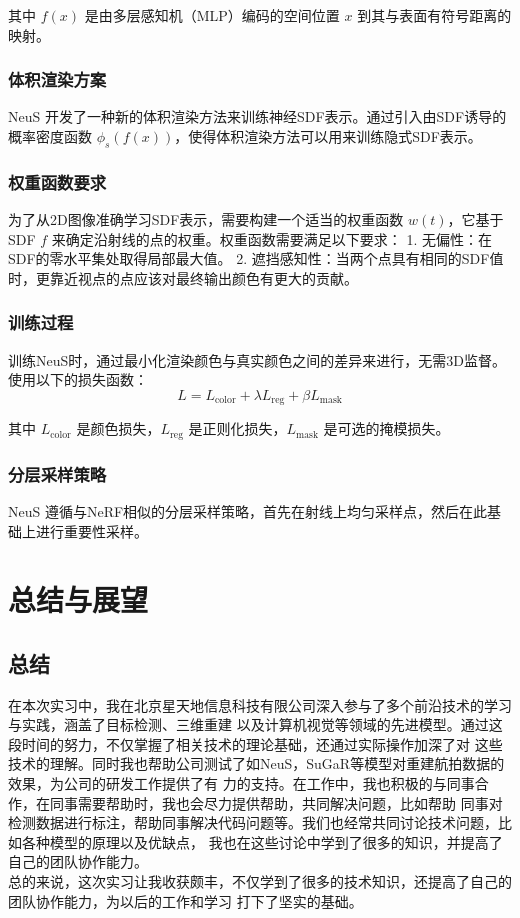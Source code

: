 \documentclass{nwputhesis}
\begin{document}
其中 \( f(x) \) 是由多层感知机（MLP）编码的空间位置 \( x \) 到其与表面有符号距离的映射。

\subsubsection{体积渲染方案}
NeuS 开发了一种新的体积渲染方法来训练神经SDF表示。通过引入由SDF诱导的概率密度函数 \( \phi_s(f(x)) \)，使得体积渲染方法可以用来训练隐式SDF表示。

\subsubsection{权重函数要求}
为了从2D图像准确学习SDF表示，需要构建一个适当的权重函数 \( w(t) \)，它基于SDF \( f \) 来确定沿射线的点的权重。权重函数需要满足以下要求：
1. 无偏性：在SDF的零水平集处取得局部最大值。
2. 遮挡感知性：当两个点具有相同的SDF值时，更靠近视点的点应该对最终输出颜色有更大的贡献。

\subsubsection{训练过程}
训练NeuS时，通过最小化渲染颜色与真实颜色之间的差异来进行，无需3D监督。使用以下的损失函数：
\[ L = L_{\text{color}} + \lambda L_{\text{reg}} + \beta L_{\text{mask}} \]


其中 \( L_{\text{color}} \) 是颜色损失，\( L_{\text{reg}} \) 是正则化损失，\( L_{\text{mask}} \) 是可选的掩模损失。

\subsubsection{分层采样策略}
NeuS 遵循与NeRF相似的分层采样策略，首先在射线上均匀采样点，然后在此基础上进行重要性采样。


\makespace
\section{总结与展望}
\subsection{总结}
在本次实习中，我在北京星天地信息科技有限公司深入参与了多个前沿技术的学习与实践，涵盖了目标检测、三维重建
以及计算机视觉等领域的先进模型。通过这段时间的努力，不仅掌握了相关技术的理论基础，还通过实际操作加深了对
这些技术的理解。同时我也帮助公司测试了如NeuS，SuGaR等模型对重建航拍数据的效果，为公司的研发工作提供了有
力的支持。在工作中，我也积极的与同事合作，在同事需要帮助时，我也会尽力提供帮助，共同解决问题，比如帮助
同事对检测数据进行标注，帮助同事解决代码问题等。我们也经常共同讨论技术问题，比如各种模型的原理以及优缺点，
我也在这些讨论中学到了很多的知识，并提高了自己的团队协作能力。\\
\indent
总的来说，这次实习让我收获颇丰，不仅学到了很多的技术知识，还提高了自己的团队协作能力，为以后的工作和学习
打下了坚实的基础。
\end{document}
